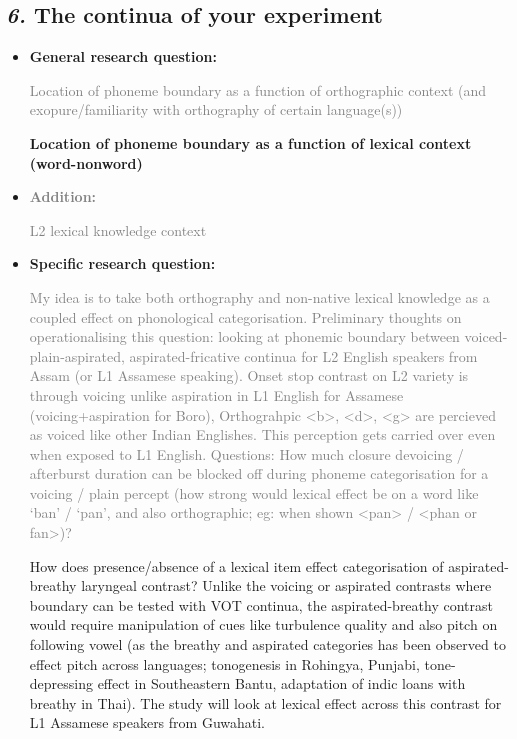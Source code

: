 \documentclass[12pt, english]{article}
\begin{document}
\subsection*{\emph{6.} The continua of your experiment}
\vspace{10pt}

\begin{itemize}
    \item \textbf{General research question:} \par
    \textcolor{gray}{Location of phoneme boundary as a function of orthographic context (and exopure/familiarity with orthography of certain language(s))} \par
    \textbf{Location of phoneme boundary as a function of lexical context (word-nonword)}
    \item \textbf{\textcolor{gray}{Addition:}} \par
    \textcolor{gray}{L2 lexical knowledge context}
    \item \textbf{Specific research question:} \par
    \textcolor{gray}{My idea is to take both orthography and non-native lexical knowledge as a coupled effect on phonological categorisation. Preliminary thoughts on operationalising this question: looking at phonemic boundary between voiced-plain-aspirated, aspirated-fricative continua for L2 English speakers from Assam (or L1 Assamese speaking). Onset stop contrast on L2 variety is through voicing unlike aspiration in L1 English for Assamese (voicing+aspiration for Boro), Orthograhpic <b>, <d>, <g> are percieved as voiced like other Indian Englishes. This perception gets carried over even when exposed to L1 English. Questions: How much closure devoicing / afterburst duration can be blocked off during phoneme categorisation for a voicing / plain percept (how strong would lexical effect be on a word like `ban' / `pan', and also orthographic; eg: when shown <pan> / <phan or fan>)?} \par
    How does presence/absence of a lexical item effect categorisation of aspirated-breathy laryngeal contrast? Unlike the voicing or aspirated contrasts where boundary can be tested with VOT continua, the aspirated-breathy contrast would require manipulation of cues like turbulence quality and also pitch on following vowel (as the breathy and aspirated categories has been observed to effect pitch across languages; tonogenesis in Rohingya, Punjabi, tone-depressing effect in Southeastern Bantu, adaptation of indic loans with breathy in Thai). The study will look at lexical effect across this contrast for L1 Assamese speakers from Guwahati.       

\end{itemize}
\end{document}
